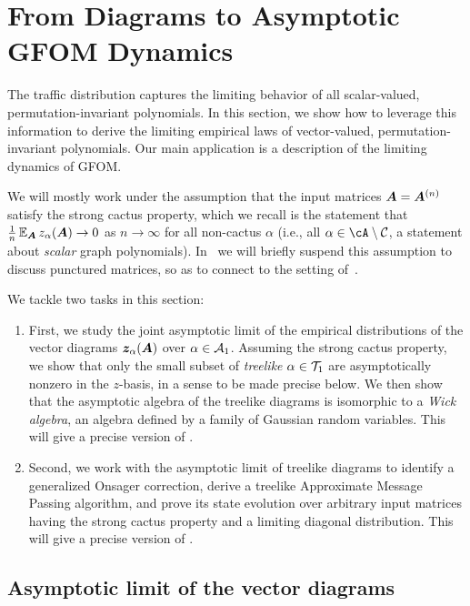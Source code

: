 \section{From Diagrams to Asymptotic GFOM Dynamics}
\label{sec:dynamics}


The traffic distribution captures the limiting behavior of all scalar-valued,
permutation-invariant polynomials. In this section, we show how to leverage this
information to derive the limiting empirical laws of vector-valued,
permutation-invariant polynomials. Our main application is a description of the
limiting dynamics of GFOM.


We will mostly work under the assumption that the input matrices ${\bm A} = {\bm A}^{(n)}$ satisfy the strong cactus property, which we recall is the statement that $\frac{1}{n}\operatorname*{\mathbb{E}}_{\bm A} z_{\alpha}({\bm A}) \to 0$ as $n \to \infty$ for all non-cactus $\alpha$ (i.e., all $\alpha \in \cA \setminus \cC$, a statement about \emph{scalar} graph polynomials).
In~ we will briefly suspend this assumption to discuss punctured matrices, so as to connect to the setting of~.

We tackle two tasks in this section:
\begin{enumerate}
    \item First, we study the joint asymptotic limit of the empirical distributions of the vector diagrams ${\bm z}_\alpha({\bm A})$ over $\alpha \in {\cal A}_1$. 
    Assuming the strong cactus property, we show that only the small subset of \emph{treelike} $\alpha \in {\cal T}_1$ are asymptotically nonzero in the $z$-basis, in a sense to be made precise below.
    We then show that the asymptotic algebra of the treelike diagrams is isomorphic to a \emph{Wick algebra}, an algebra defined by a family of Gaussian random variables.
    This will give a precise version of .
    \item Second, we work with the asymptotic limit of treelike diagrams to identify a generalized Onsager correction, derive a treelike Approximate Message Passing algorithm, and prove its state evolution over arbitrary input matrices having the strong cactus property and a limiting diagonal distribution.
    This will give a precise version of .
\end{enumerate}

\subsection{Asymptotic limit of the vector diagrams}
\label{sec:vector-limit}

